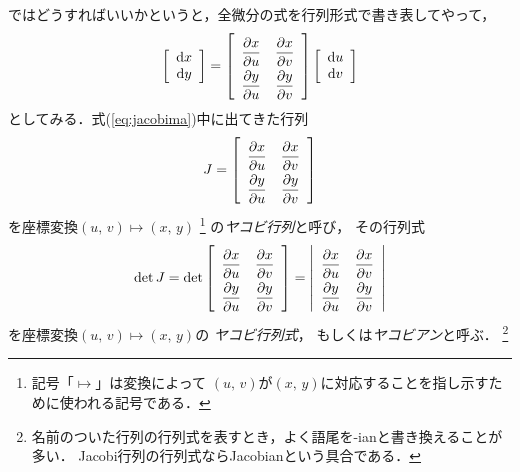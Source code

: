 ではどうすればいいかというと，全微分の式を行列形式で書き表してやって，
\begin{align}
\left[
\begin{array}{c}
\mathrm{d} x \\
\mathrm{d} y
\end{array}
\right]
= \left[
\renewcommand{\arraystretch}{2}
\begin{array}{cc}
\dfrac{ \partial x}{\partial u} & \dfrac{ \partial x}{\partial v} \\
\dfrac{ \partial y}{\partial u} & \dfrac{ \partial y}{\partial v} \\
\end{array}
\renewcommand{\arraystretch}{1}
\right]
\left[
\begin{array}{c}
\mathrm{d}u \\
\mathrm{d} v
\end{array}
\right]
\label{eq:jacobima}
\end{align}
としてみる．式(\ref{eq:jacobima})中に出てきた行列
\begin{align}
J = \left[
\renewcommand{\arraystretch}{2}
\begin{array}{cc}
\dfrac{ \partial x}{\partial u} & \dfrac{ \partial x}{\partial v} \\
\dfrac{ \partial y}{\partial u} & \dfrac{ \partial y}{\partial v} \\
\end{array}
\renewcommand{\arraystretch}{1}
\right]
\label{eq:jacobimatrix}
\end{align}
を座標変換$(u, \, v) \mapsto (x, \, y)$
\footnote{記号「$\mapsto$」は変換によって
$(u, \, v)$が$(x, \, y)$に対応することを指し示すために使われる記号である．}
の\emph{ヤコビ行列}と呼び，
その行列式
\begin{align}
\det J = \det \left[
\renewcommand{\arraystretch}{2}
\begin{array}{cc}
\dfrac{ \partial x}{\partial u} & \dfrac{ \partial x}{\partial v} \\
\dfrac{ \partial y}{\partial u} & \dfrac{ \partial y}{\partial v} \\
\end{array}
\renewcommand{\arraystretch}{1}
\right] = \left \lvert
\renewcommand{\arraystretch}{2}
\begin{array}{cc}
\dfrac{ \partial x}{\partial u} & \dfrac{ \partial x}{\partial v} \\
\dfrac{ \partial y}{\partial u} & \dfrac{ \partial y}{\partial v} \\
\end{array}
\renewcommand{\arraystretch}{1}
\right \rvert
\label{eq:jacobian}
\end{align}
を座標変換$(u, \, v) \mapsto (x, \, y)$の
\emph{ヤコビ行列式}，
もしくは\emph{ヤコビアン}と呼ぶ．
\footnote{名前のついた行列の行列式を表すとき，よく語尾を-ianと書き換えることが多い．
Jacobi行列の行列式ならJacobianという具合である．}

